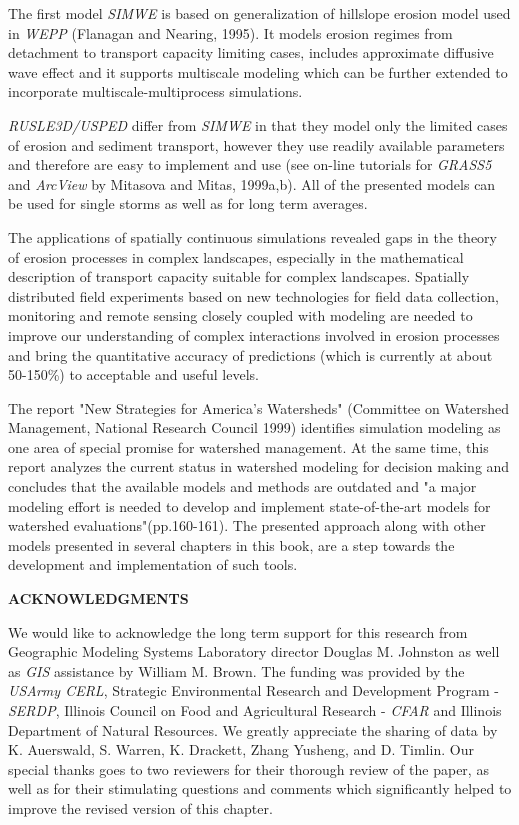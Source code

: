 \documentclass{kapedbk} %
\begin{document}
The first model {\sl SIMWE} is based on generalization of
hillslope erosion model used in {\sl WEPP} (Flanagan and Nearing, 1995).
It models erosion regimes from detachment to transport capacity limiting 
cases, includes approximate diffusive wave effect and  
it supports multiscale modeling which can be further
extended to incorporate multiscale-multiprocess simulations. 

{\sl RUSLE3D/USPED} differ from {\sl SIMWE} in that they model only the limited 
cases of erosion and sediment transport, however they use readily available
parameters and therefore are easy to implement and use
(see on-line tutorials for {\sl GRASS5} and {\sl ArcView} by 
Mitasova and Mitas, 1999a,b).
All of the presented models can be
used for single storms as well as for long term averages.

The applications of spatially continuous simulations
revealed gaps in the theory of erosion processes in complex landscapes,
especially in the mathematical description of
transport capacity suitable for complex landscapes.
Spatially distributed field experiments based on new technologies for field
data collection, monitoring and remote sensing
closely coupled with modeling are needed to improve our understanding
of complex interactions involved in erosion processes and bring the quantitative
accuracy of predictions (which is currently at about 50-150\%) to acceptable
and useful levels.

The report "New Strategies for
America's Watersheds" (Committee on Watershed Management, National Research
Council 1999) identifies simulation modeling
as one area of special promise for watershed management.
At the same time,
this report analyzes the current status in watershed modeling for decision
making and concludes that the available models and methods are outdated
and "a major modeling effort is needed to develop and implement state-of-the-art
models for watershed evaluations"(pp.160-161).
The presented approach along with other models presented in several 
chapters in this book,
are a step towards the development and implementation of such tools.


\bigskip
\noindent
{\bf ACKNOWLEDGMENTS}

\medskip
We would like to acknowledge the long term support for this research
from Geographic Modeling Systems Laboratory
director Douglas M. Johnston as well as {\sl GIS} assistance by William
M. Brown. The funding was provided by the {\sl USArmy CERL},
Strategic Environmental Research and Development Program - {\sl SERDP},
Illinois Council on Food and Agricultural Research - {\sl CFAR}
 and Illinois Department of Natural Resources.
We greatly appreciate the sharing of data by K. Auerswald, S. Warren,
K. Drackett, Zhang Yusheng, and D. Timlin.
Our special thanks goes to two reviewers for their thorough review of the paper,
as well as for their stimulating questions and comments which 
significantly helped to improve the revised version of this chapter.
\end{document}
